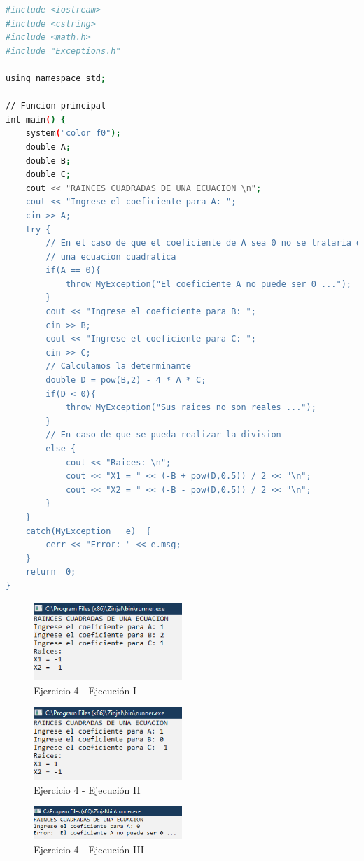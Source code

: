 \documentclass[12pt]{article}
\begin{document}
\begin{lstlisting}[language=bash,frame=single,style=CStyle]
#include <iostream>
#include <cstring>	
#include <math.h>
#include "Exceptions.h"

using namespace std;

// Funcion principal
int	main() {
	system("color f0");
	double A;
	double B;
	double C;
	cout << "RAINCES CUADRADAS DE UNA ECUACION \n";
	cout << "Ingrese el coeficiente para A: ";
	cin >> A;
	try	{
		// En el caso de que el coeficiente de A sea 0 no se trataria de
		// una ecuacion cuadratica
		if(A == 0){
			throw MyException("El coeficiente A no puede ser 0 ...");
		}
		cout << "Ingrese el coeficiente para B: ";
		cin >> B;
		cout << "Ingrese el coeficiente para C: ";
		cin >> C;
		// Calculamos la determinante
		double D = pow(B,2) - 4 * A * C;
		if(D < 0){
			throw MyException("Sus raices no son reales ...");
		}
		// En caso de que se pueda realizar la division
		else {
			cout << "Raices: \n";
			cout << "X1 = " << (-B + pow(D,0.5)) / 2 << "\n";
			cout << "X2 = " << (-B - pow(D,0.5)) / 2 << "\n";
		}
	}
	catch(MyException	e)	{
		cerr <<	"Error:	" << e.msg;
	}
	return	0;
}
\end{lstlisting}

\begin{figure}[h]
    \centering
    \includegraphics[width=0.5\textwidth]{images/Capture04A.PNG}
    \caption{Ejercicio 4 - Ejecución I}
\end{figure}

\begin{figure}[h]
    \centering
    \includegraphics[width=0.5\textwidth]{images/Capture04B.PNG}
    \caption{Ejercicio 4 - Ejecución II}
\end{figure}

\begin{figure}[h]
    \centering
    \includegraphics[width=0.5\textwidth]{images/Capture04C.PNG}
    \caption{Ejercicio 4 - Ejecución III}
\end{figure}
\end{document}
